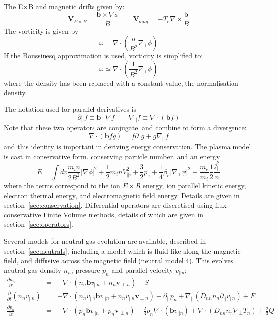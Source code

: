 \documentclass[12pt,a4paper]{article}
\begin{document}
The E$\times$B and magnetic drifts given by:
\begin{equation}
\mathbf{V}_{E\times B} = \frac{\mathbf{b}\times\nabla \phi}{B} \qquad \mathbf{V}_{mag} = -T_e\nabla\times\frac{\mathbf{b}}{B}
\end{equation}
The vorticity is given by
\begin{equation}
\omega = \nabla\cdot\left(\frac{n}{B^2}\nabla_\perp \phi\right)
\end{equation}
If the Boussinesq approximation is used,  vorticity is simplified to:
\begin{equation}
\omega \simeq \nabla\cdot\left(\frac{1}{B^2}\nabla_\perp \phi\right)
\end{equation}
where the density has been replaced with a constant value, the normalisation density.

The notation used for parallel derivatives is
\begin{equation}
  \partial_{||} f \equiv \mathbf{b}\cdot\nabla f \qquad \nabla_{||} f \equiv \nabla\cdot\left(\mathbf{b} f\right)
\end{equation}
Note that these two operators are conjugate, and combine to form a divergence:
\[
\nabla\cdot\left(\mathbf{b}fg\right) = f\partial_{||} g + g \nabla_{||} f
\]
and this identity is important in deriving energy conservation.
The plasma model is cast in conservative form, conserving particle number, and an energy
\begin{equation}
E = \int dv \frac{m_in}{2B^2}\left|\nabla\phi\right|^2 + \frac{1}{2}m_inV_{||i}^2 + \frac{3}{2}p_e + \frac{1}{4}\beta_e\left|\nabla_\perp\psi\right|^2 + \frac{m_e}{m_i}\frac{1}{2}\frac{j_{||}^2}{n}
\end{equation}
where the terms correspond to the ion $E\times B$ energy, ion parallel kinetic energy, electron thermal energy, and electromagnetic field energy. Details are given in section~\ref{sec:conservation}. Differential operators are discretised using flux-conservative Finite Volume methods, details of which are given in section~\ref{sec:operators}. 

Several models for neutral gas evolution are available, described in section~\ref{sec:neutrals}, including a model which is fluid-like along the magnetic field, and diffusive across the magnetic field (neutral model 4). This evolves neutral gas density $n_n$, pressure $p_n$ and parallel velocity $v_{||n}$:
\begin{eqnarray}
  \frac{\partial n_n}{\partial t} &=& -\nabla\cdot\left(n_n\mathbf{b}v_{||n} + n_n\mathbf{v}_{\perp n}\right) + S\\
  \frac{\partial}{\partial t}\left(n_nv_{||n}\right) &=& -\nabla\cdot\left(n_nv_{||n} \mathbf{b}v_{||n} + n_nv_{||n}\mathbf{v}_{\perp n}\right) - \partial_{||}p_n + \nabla_{||}\left(D_{nn}n_n\partial_{||}v_{||n}\right) + F \\
  \frac{\partial p_n}{\partial t} &=& -\nabla\cdot\left(p_n\mathbf{b}v_{||n} + p_n\mathbf{v}_{\perp n}\right) - \frac{2}{3}p_n\nabla\cdot\left(\mathbf{b}v_{||n}\right) + \nabla\cdot\left(D_{nn}n_n\nabla_\perp T_n\right) + \frac{2}{3}Q
\end{eqnarray}
\end{document}
